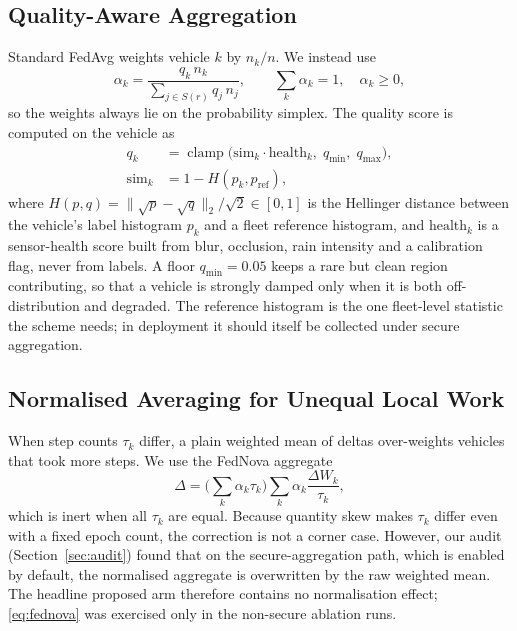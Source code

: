 \documentclass[journal]{IEEEtran}
\DeclareMathOperator{\clamp}{clamp}
\begin{document}
\subsection{Quality-Aware Aggregation}\label{sec:quality}
Standard FedAvg weights vehicle $k$ by $n_k/n$. We instead use
\begin{equation}
\alpha_k=\frac{q_k\,n_k}{\sum_{j\in S(r)}q_j\,n_j},\qquad \sum_{k}\alpha_k=1,\quad \alpha_k\ge 0,
\label{eq:alpha}
\end{equation}
so the weights always lie on the probability simplex. The quality score is computed on the vehicle as
\begin{equation}
\begin{aligned}
q_k&=\clamp\!\big(\mathrm{sim}_k\cdot \mathrm{health}_k,\;q_{\min},\;q_{\max}\big),\\
\mathrm{sim}_k&=1-H(p_k,p_{\mathrm{ref}}),
\end{aligned}
\label{eq:quality}
\end{equation}
where $H(p,q)=\lVert\sqrt{p}-\sqrt{q}\rVert_2/\sqrt{2}\in[0,1]$ is the Hellinger distance between the vehicle's label histogram $p_k$ and a fleet reference histogram, and $\mathrm{health}_k$ is a sensor-health score built from blur, occlusion, rain intensity and a calibration flag, never from labels. A floor $q_{\min}=0.05$ keeps a rare but clean region contributing, so that a vehicle is strongly damped only when it is both off-distribution and degraded. The reference histogram is the one fleet-level statistic the scheme needs; in deployment it should itself be collected under secure aggregation.

\subsection{Normalised Averaging for Unequal Local Work}\label{sec:fednova}
When step counts $\tau_k$ differ, a plain weighted mean of deltas over-weights vehicles that took more steps. We use the FedNova aggregate~\cite{wang2020fednova}
\begin{equation}
\Delta=\Big(\sum_{k}\alpha_k\tau_k\Big)\sum_{k}\alpha_k\frac{\Delta W_k}{\tau_k},
\label{eq:fednova}
\end{equation}
which is inert when all $\tau_k$ are equal. Because quantity skew makes $\tau_k$ differ even with a fixed epoch count, the correction is not a corner case. However, our audit (Section~\ref{sec:audit}) found that on the secure-aggregation path, which is enabled by default, the normalised aggregate is overwritten by the raw weighted mean. The headline proposed arm therefore contains no normalisation effect; \eqref{eq:fednova} was exercised only in the non-secure ablation runs.
\end{document}
